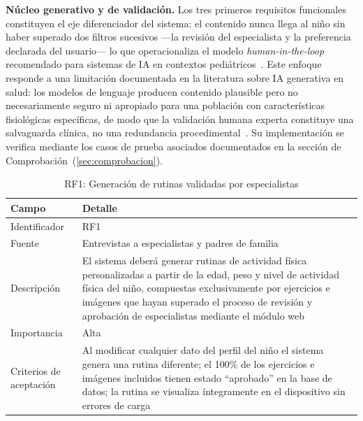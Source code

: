 					\textbf{Núcleo generativo y de validación.} Los tres primeros requisitos funcionales constituyen el eje diferenciador del sistema: el contenido nunca llega al niño sin haber superado dos filtros sucesivos ---la revisión del especialista y la preferencia declarada del usuario--- lo que operacionaliza el modelo \textit{human-in-the-loop} recomendado para sistemas de IA en contextos pediátricos~\cite{Yim2024,Zaleski2026}. Este enfoque responde a una limitación documentada en la literatura sobre IA generativa en salud: los modelos de lenguaje producen contenido plausible pero no necesariamente seguro ni apropiado para una población con características fisiológicas específicas, de modo que la validación humana experta constituye una salvaguarda clínica, no una redundancia procedimental~\cite{Sengar2024,Dergaa2024}. Su implementación se verifica mediante los casos de prueba asociados documentados en la sección de Comprobación~(\ref{sec:comprobacion}).
					
					\begin{table}[H]
						\centering\small
						\caption{RF1: Generación de rutinas validadas por especialistas}
						\label{tab:rf1}
						\begin{tabular}{p{3.5cm}p{11cm}}
							\hline
							\textbf{Campo} & \textbf{Detalle} \\
							\hline
							Identificador & RF1 \\
							
							Fuente & Entrevistas a especialistas y padres de familia \\
							
							Descripción & El sistema deberá generar rutinas de actividad física personalizadas a partir de la edad, peso y nivel de actividad física del niño, compuestas exclusivamente por ejercicios e imágenes que hayan superado el proceso de revisión y aprobación de especialistas mediante el módulo web \\
							
							Importancia & Alta \\
							
							Criterios de aceptación & Al modificar cualquier dato del perfil del niño el sistema genera una rutina diferente; el 100\% de los ejercicios e imágenes incluidos tienen estado ``aprobado'' en la base de datos; la rutina se visualiza íntegramente en el dispositivo sin errores de carga \\
							\hline
						\end{tabular}
					\end{table} \tblnote
					

